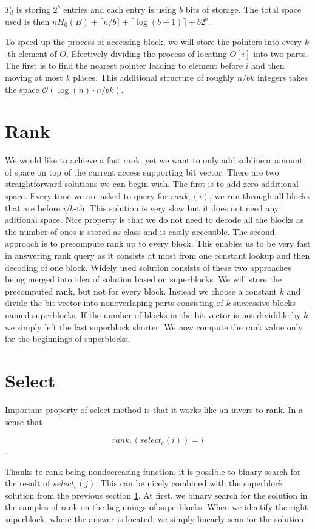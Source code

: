 $T_d$ is storing $2^b$ entries and each entry is using $b$ bits of storage.
The total space used is then $nH_0(B) +  \lceil n/b \rceil + \lceil \log(b+1) \rceil + b2^b$.

To speed up the process of accessing block, we will store the pointers into every
$k$-th element of $O$. Efectively dividing the process of locating $O[i]$ into two
parts. The first is to find the nearest pointer leading to element before $i$ and
then moving at most $k$ places. This additional structure of roughly $n/bk$ integers
takes the space $\mathcal{O}(\log(n)\cdot n/bk)$.

\section{Rank}
\label{section:rank}

We would like to achieve a fast rank, yet we want to only add sublinear amount of
space on top of the current access supporting bit vector. There are two straightforward
solutions we can begin with. The first is to add zero additional space. Every
time we are asked to query for $rank_c(i)$, we run through all blocks that are
before $i/b$-th. This solution is very slow but it does not need any aditional space.
Nice property is that we do not need to decode all the blocks as the number of ones
is stored as class and is easily accessible.
The second approach is to precompute rank up to every block. This enables us to be very
fast in answering rank query as it consists at most from one constant lookup and then
decoding of one block. Widely used solution consists of these two approaches being merged
into idea of solution based on superblocks. We will store the precomputed rank, but not
for every block. Instead we choose a constant $k$ and divide the bit-vector into nonoverlaping
parts consisting of $k$ successive blocks named superblocks. If the number of blocks in
the bit-vector is not dividible by $k$ we simply left the last superblock shorter. We
now compute the rank value only for the beginnings of superblocks.

\section{Select}

Important property of select method is that it works like an invers to rank. In a sense that

                $$rank_c(select_c(i)) = i$$.

Thanks to rank being nondecreasing function, it is possible to binary search for the result
of $select_c(j)$. This can be nicely combined with the superblock solution from the previous
section \ref{section:rank}. At first, we binary search for the solution in the samples of rank
on the beginnings of superblocks. When we identify the right superblock, where the answer is
located, we simply linearly scan for the solution.

